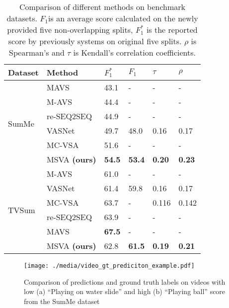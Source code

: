 \documentclass{article}
\begin{document}
\begin{table}[ht]
\caption{Comparison of different methods on benchmark datasets. $F_{1}$is an average score calculated on the newly provided five non-overlapping splits, $F_{1}^*$ is the reported score by previously systems on original five splits. $\rho$ is Spearman’s and $\tau$ is Kendall’s correlation coefficients.}
\centering
\begin{tabular}{|*{6}{l|}}
\hline

\textbf{Dataset} & Method & $F_{1}^*$ & $F_{1}$ &  $\tau$ &  $\rho$ \\ \hline

\multirow{6}{2.2em}{SumMe} & MAVS \cite{DBLP:conf/mm/FengLKZ18} & 43.1 & - & - & - \\ \cline{2-6}
 & M-AVS \cite{DBLP:journals/corr/abs-1708-09545} & 44.4 & - & - & - \\ \cline{2-6} 
&  re-SEQ2SEQ \cite{DBLP:conf/eccv/ZhangGS18} & 44.9 & - & - & -\\ \cline{2-6} 
&  VASNet \cite{DBLP:conf/accv/FajtlSAMR18} & 49.7 & 48.0 & 0.16 & 0.17
\\
\cline{2-6} &  MC-VSA \cite{DBLP:journals/corr/abs-2006-01410} & 51.6 & - & - & - \\
\cline{2-6} & MSVA \textbf{(ours)} & \textbf{54.5}  & \textbf{53.4} & \textbf{0.20} & \textbf{0.23} \\

 \hline \hline 

 \multirow{6}{2.2em}{TVSum} & M-AVS \cite{DBLP:journals/corr/abs-1708-09545} &61.0 & - & - & - \\  \cline{2-6}
 &  VASNet \cite{DBLP:conf/accv/FajtlSAMR18} &61.4 & 59.8  & 0.16 & 0.17 \\  \cline{2-6}
&  MC-VSA \cite{DBLP:journals/corr/abs-2006-01410} & 63.7 & - & 0.116 & 0.142 \\  \cline{2-6} 
 &  re-SEQ2SEQ \cite{DBLP:conf/eccv/ZhangGS18} &63.9 & - & - & - \\ \cline{2-6}
 & MAVS \cite{DBLP:conf/mm/FengLKZ18} & \textbf{67.5} & - & - & - \\  \cline{2-6}
 & MSVA \textbf{(ours)} &62.8 & \textbf{61.5} & \textbf{0.19} & \textbf{0.21} \\
\hline 
 
\end{tabular}

\label{tab:overallcompare}
\end{table}

\begin{figure*}[!ht]
\begin{center}
\texttt{[image: ./media/video\_gt\_prediciton\_example.pdf]}
\caption{Comparison of predictions and ground truth labels on videos with low (a) ``Playing on water slide'' and high (b) ``Playing ball'' score from the SumMe dataset}
\label{fig:example_good_bad}
\end{center}
\end{figure*}
\end{document}
